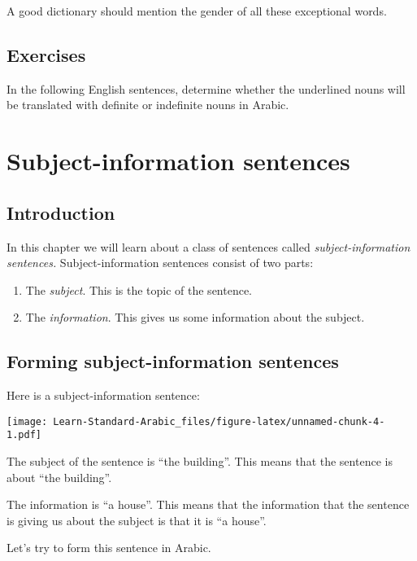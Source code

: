 \documentclass[
  10pt,
]{book}
\providecommand{\tightlist}{%
  \setlength{\itemsep}{0pt}\setlength{\parskip}{0pt}}
\begin{document}
A good dictionary should mention the gender of all these exceptional words.

\section{Exercises}\label{exercises}

In the following English sentences, determine whether the underlined nouns will be translated with definite or indefinite nouns in Arabic.

\chapter{Subject-information sentences}\label{subject-information-sentences}

\section{Introduction}\label{introduction-2}

In this chapter we will learn about a class of sentences called \emph{subject-information sentences.}
Subject-information sentences consist of two parts:

\begin{enumerate}
\def\labelenumi{\roman{enumi}.}
\tightlist
\item
  The \emph{subject}. This is the topic of the sentence.
\item
  The \emph{information}. This gives us some information about the subject.
\end{enumerate}

\section{Forming subject-information sentences}\label{forming-subject-information-sentences}

Here is a subject-information sentence:

\texttt{[image: Learn-Standard-Arabic\_files/figure-latex/unnamed-chunk-4-1.pdf]}

The subject of the sentence is \enquote{the building}. This means that the sentence is about \enquote{the building}.

The information is \enquote{a house}. This means that the information that the sentence is giving us about the subject is that it is \enquote{a house}.

Let's try to form this sentence in Arabic.
\end{document}
